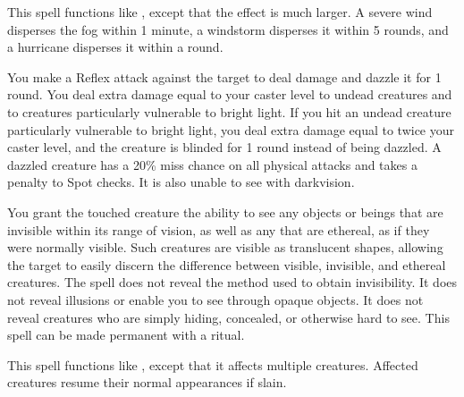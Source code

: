 \spelleffect This spell functions like , except that the effect is much larger.
\spellnotes A severe wind disperses the fog within 1 minute, a windstorm disperses it within 5 rounds, and a hurricane disperses it within a round.

\spelleffect You make a Reflex attack against the target to deal damage and dazzle it for 1 round. You deal extra damage equal to your caster level to undead creatures and to creatures particularly vulnerable to bright light. If you hit an undead creature particularly vulnerable to bright light, you deal extra damage equal to twice your caster level, and the creature is blinded for 1 round instead of being dazzled.
\spellnotes A dazzled creature has a 20\% miss chance on all physical attacks and takes a  penalty to Spot checks. It is also unable to see with darkvision.

\spelldur{\durlong \dismissable}
\spelleffect You grant the touched creature the ability to see any objects or beings that are invisible within its range of vision, as well as any that are ethereal, as if they were normally visible. Such creatures are visible as translucent shapes, allowing the target to easily discern the difference between visible, invisible, and ethereal creatures.
\spellnotes The spell does not reveal the method used to obtain invisibility. It does not reveal illusions or enable you to see through opaque objects. It does not reveal creatures who are simply hiding, concealed, or otherwise hard to see.
This spell can be made permanent with a  ritual.

\spelldur{\durlong \dismissable}
\spelleffect This spell functions like , except that it affects multiple creatures. Affected creatures resume their normal appearances if slain.

